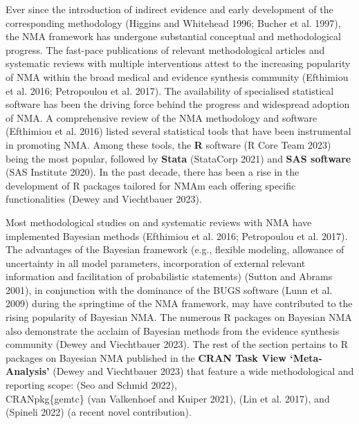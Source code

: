 Ever since the introduction of indirect evidence and early development of the corresponding
methodology (Higgins and Whitehead 1996; Bucher et al. 1997), the NMA framework has undergone substantial conceptual and methodological 
progress. The fast-pace publications of relevant
methodological articles and systematic reviews with multiple interventions attest
to the increasing popularity of NMA within the broad medical and evidence synthesis
community (Efthimiou et al. 2016; Petropoulou et al. 2017). The availability
of specialised statistical software has been the driving force behind the progress and widespread adoption of NMA. A comprehensive review of the NMA methodology and software
(Efthimiou et al. 2016) listed several statistical tools that have been instrumental in promoting NMA. Among these tools, 
the \textbf{R} software (R Core Team 2023) being the most popular, followed by \textbf{Stata} (StataCorp 2021)
and \textbf{SAS software} (SAS Institute 2020). In the past decade, there has been a rise in the development of
R packages tailored for NMAm each offering specific functionalities (Dewey and Viechtbauer 2023).

Most methodological studies on and systematic reviews with NMA have implemented
Bayesian methods (Efthimiou et al. 2016; Petropoulou et al. 2017). The advantages of the Bayesian
framework (e.g., flexible modeling, allowance of uncertainty in all model parameters,
incorporation of external relevant information and facilitation of probabilistic
statements) (Sutton and Abrams 2001), in conjunction with the dominance of the BUGS software
(Lunn et al. 2009) during the springtime of the NMA framework, may have contributed to
the rising popularity of Bayesian NMA. The numerous R packages on Bayesian NMA
also demonstrate the acclaim of Bayesian methods from the evidence synthesis
community (Dewey and Viechtbauer 2023). The rest of the section pertains to R packages on
Bayesian NMA published in the \textbf{CRAN Task View `Meta-Analysis'} (Dewey and Viechtbauer 2023)
that feature a wide methodological and reporting scope:  (Seo and Schmid 2022),\\
CRANpkg\{gemtc\} (van Valkenhoef and Kuiper 2021),  (Lin et al. 2017), and 
(Spineli 2022) (a recent novel contribution).

